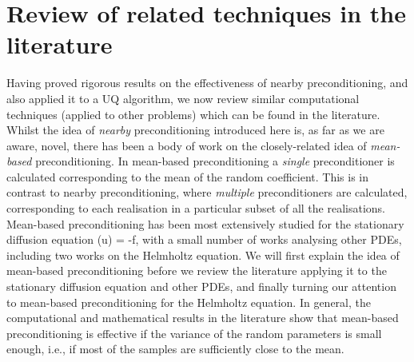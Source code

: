 
\section{Review of related techniques in the literature}\label{sec:nbpclitreview}
   
Having proved rigorous results on the effectiveness of nearby preconditioning, and also applied it to a UQ algorithm, we now review similar computational techniques (applied to other problems) which can be found in the literature. Whilst the idea of \emph{nearby} preconditioning introduced here is, as far as we are aware, novel, there has been a body of work on the closely-related idea of \emph{mean-based} preconditioning. In mean-based preconditioning a \emph{single} preconditioner is calculated corresponding to the mean of the random coefficient. This is in contrast to nearby preconditioning, where \emph{multiple} preconditioners are calculated, corresponding to each realisation in a particular subset of all the realisations. Mean-based preconditioning has been most extensively studied for the stationary diffusion equation
    \beqs
\grad \cdot \mleft(\kappa\grad u\mright)  = -f,
\eeqs
with a small number of works analysing other PDEs, including two works on the Helmholtz equation. We will first explain the idea of mean-based preconditioning before we review the literature applying it to the stationary diffusion equation and other PDEs, and finally turning our attention to mean-based preconditioning for the Helmholtz equation. In general, the computational and mathematical results in the literature show that mean-based preconditioning  is effective if the variance of the random parameters is small enough, i.e.,  if most of the samples are sufficiently close to the mean.


